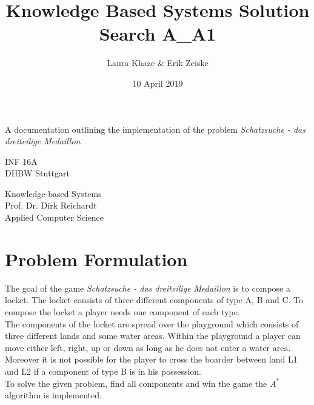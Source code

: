 \documentclass{article}
\title{Knowledge Based Systems Solution Search A\_A1}
\author{Laura Khaze \& Erik Zeiske}
\date{10 April 2019}
\newcommand{\problem}{Schatzsuche - das dreiteilige Medaillon}
\begin{document}
\begin{titlepage}
    \begin{center}
        \vspace*{1cm}
 
        \Huge
        \textbf{\@title}
 
        \vspace{0.5cm}
        \LARGE
        A documentation outlining the implementation of the problem \textit{\problem}
 
        \vspace{1.5cm}
 
        \textbf{\@author}
 
        \vfill
        INF 16A\\
        DHBW Stuttgart\\
        \@date
       
        \vspace{1.8cm}
 
        Knowledge-based Systems \\
        Prof. Dr. Dirk Reichardt \\
        Applied Computer Science
 
 
    \end{center}
\end{titlepage}
\section{Problem Formulation} \label{problem_formulation}
The goal of the game \textit{\problem} is to compose a locket. The locket consists of three different components of type A, B and C. To compose the locket a player needs one component of each type. \\
The components of the locket are spread over the playground which consists of three different lands and some water areas. Within the playground a player can move either left, right, up or down as long as he does not enter a water area. Moreover it is not possible for the player to cross the boarder between land L1 and L2 if a component of type B is in his possession. \\
To solve the given problem, find all components and win the game the $A^*$ algorithm is implemented. \\
\end{document}
